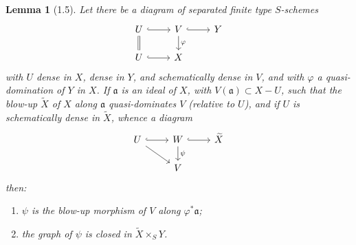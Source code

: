 \documentclass[10pt,a4paper]{article}
\theoremstyle{deligne}
\newtheorem*{lemma*}{Lemma}
\begin{document}
\begin{lemma*}[1.5]
Let there be a diagram of separated finite type \(S\)-schemes
\[
\begin{tikzcd}[column sep=2.4em,row sep=1.5em]
U \arrow[r,hook] \arrow[d,equal] & V \arrow[r,hook] \arrow[d,"\varphi"] & Y \\
U \arrow[r,hook] & X
\end{tikzcd}
\]
with \(U\) dense in \(X\), dense in \(Y\), and schematically dense in \(V\), and with \(\varphi\) a quasi-domination of \(Y\) in \(X\). If \(\mathfrak a\) is an ideal of \(X\), with \(V(\mathfrak a)\subset X-U\), such that the blow-up \(\widetilde X\) of \(X\) along \(\mathfrak a\) quasi-dominates \(V\) (relative to \(U\)), and if \(U\) is schematically dense in \(\widetilde X\), whence a diagram
\[
\begin{tikzcd}[column sep=2.4em,row sep=1.5em]
U \arrow[r,hook] \arrow[dr] & W \arrow[r,hook] \arrow[d,"\psi"] & \widetilde X \\
& V
\end{tikzcd}
\]
then:
\begin{enumerate}[label=(\alph*)]
\item \(\psi\) is the blow-up morphism of \(V\) along \(\varphi^*\mathfrak a\);
\item the graph of \(\psi\) is closed in \(\widetilde X\times_S Y\).
\end{enumerate}
\end{lemma*}
\end{document}
